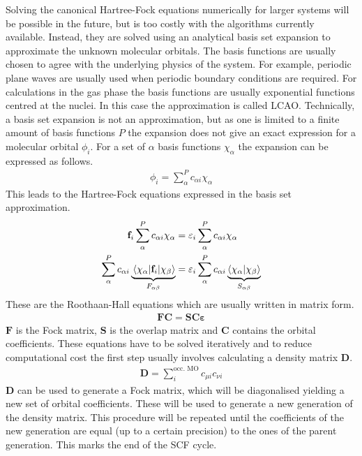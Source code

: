 Solving the canonical Hartree-Fock equations numerically for larger systems will
be possible in the future, but is too costly with the algorithms currently available.  
Instead, they are solved using an analytical basis set expansion to
approximate the unknown molecular orbitals. The basis functions are usually
chosen to agree with the underlying physics of the system. For example,
periodic plane waves are usually used when periodic boundary conditions are
required. For calculations in the gas phase the basis functions are usually
exponential functions centred at the nuclei. In this case the approximation is
called \ac{LCAO}.  Technically, a basis set expansion is not an approximation,
but as one is limited to a finite amount of basis functions $P$ the expansion
does not give an exact expression for a molecular orbital $\phi_i$. For a set
of $\alpha$ basis functions $\chi_\alpha$ the expansion can be expressed as
follows.
%
\begin{align}
    \phi_i=\sum_\alpha^Pc_{\alpha i}\chi_\alpha
\end{align}
%
This leads to the Hartree-Fock equations expressed in the basis set
approximation.
%
\begin{align}
    \begin{aligned}
        \mathbf{f}_i\sum_\alpha^Pc_{\alpha i}\chi_\alpha&=\varepsilon_i\sum_\alpha^Pc_{\alpha i}\chi_\alpha \\
        \sum_\alpha^Pc_{\alpha i}\underbrace{\mel{\chi_\alpha}{\mathbf{f}_i}{\chi_\beta}}_{F_{\alpha\beta}}&=\varepsilon_i\sum_\alpha^Pc_{\alpha i}\underbrace{\braket{\chi_\alpha}{\chi_\beta}}_{S_{\alpha\beta}}
    \end{aligned}
\end{align}
%
These are the Roothaan-Hall
equations\autocite{Roothaan_NewDevelopmentsMolecular_1951,Hall_molecularorbitaltheory_1951}
which are usually written in matrix form.
%
\begin{align}
    \mathbf{FC}=\mathbf{SC\varepsilon}
\end{align}
%
$\mathbf{F}$ is the Fock matrix, $\mathbf{S}$ is the overlap matrix and
$\mathbf{C}$ contains the orbital coefficients. These equations have to be
solved iteratively and to reduce computational cost the first step usually
involves calculating a density matrix $\mathbf{D}$.
%
\begin{align}
    \mathbf{D}=\sum_{i}^\text{occ. MO} c_{\mu i}c_{\nu i}
\end{align}
%
$\mathbf{D}$ can be used to generate a Fock matrix, which will be diagonalised
yielding a new set of orbital coefficients. These will be used to generate a
new generation of the density matrix. This procedure will be repeated until
the coefficients of the new generation are equal (up to a certain precision)
to the ones of the parent generation. This marks the end of the \ac{SCF} cycle.

